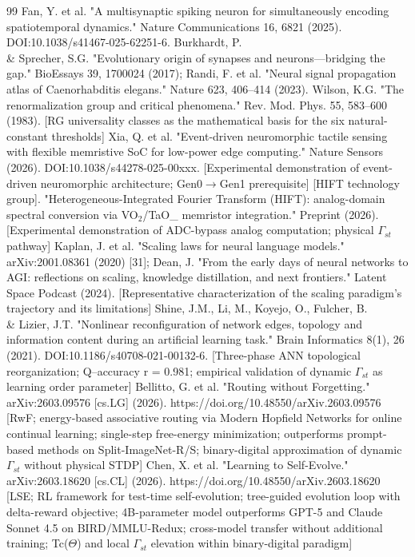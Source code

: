\documentclass[a4paper,12pt]{article}
\begin{document}
\begin{thebibliography}{99}
 Fan, Y. et al. "A multisynaptic spiking neuron for simultaneously encoding spatiotemporal dynamics." Nature Communications 16, 6821 (2025). DOI:10.1038/s41467-025-62251-6.
 Burkhardt, P. \\& Sprecher, S.G. "Evolutionary origin of synapses and neurons---bridging the gap." BioEssays 39, 1700024 (2017); Randi, F. et al. "Neural signal propagation atlas of Caenorhabditis elegans." Nature 623, 406--414 (2023).
 Wilson, K.G. "The renormalization group and critical phenomena." Rev. Mod. Phys. 55, 583--600 (1983). [RG universality classes as the mathematical basis for the six natural-constant thresholds]
 Xia, Q. et al. "Event-driven neuromorphic tactile sensing with flexible memristive SoC for low-power edge computing." Nature Sensors (2026). DOI:10.1038/s44278-025-00xxx. [Experimental demonstration of event-driven neuromorphic architecture; Gen0$\rightarrow$Gen1 prerequisite]
 [HIFT technology group]. "Heterogeneous-Integrated Fourier Transform (HIFT): analog-domain spectral conversion via VO$_2$/TaO_{} memristor integration." Preprint (2026). [Experimental demonstration of ADC-bypass analog computation; physical $\Gamma_{st}$ pathway]
 Kaplan, J. et al. "Scaling laws for neural language models." arXiv:2001.08361 (2020) [31]; Dean, J. "From the early days of neural networks to AGI: reflections on scaling, knowledge distillation, and next frontiers." Latent Space Podcast (2024). [Representative characterization of the scaling paradigm's trajectory and its limitations]
 Shine, J.M., Li, M., Koyejo, O., Fulcher, B. \\& Lizier, J.T. "Nonlinear reconfiguration of network edges, topology and information content during an artificial learning task." Brain Informatics 8(1), 26 (2021). DOI:10.1186/s40708-021-00132-6. [Three-phase ANN topological reorganization; Q--accuracy r = 0.981; empirical validation of dynamic $\Gamma_{st}$ as learning order parameter]
 Bellitto, G. et al. "Routing without Forgetting." arXiv:2603.09576 [cs.LG] (2026). https://doi.org/10.48550/arXiv.2603.09576 [RwF; energy-based associative routing via Modern Hopfield Networks for online continual learning; single-step free-energy minimization; outperforms prompt-based methods on Split-ImageNet-R/S; binary-digital approximation of dynamic $\Gamma_{st}$ without physical STDP]
 Chen, X. et al. "Learning to Self-Evolve." arXiv:2603.18620 [cs.CL] (2026). https://doi.org/10.48550/arXiv.2603.18620 [LSE; RL framework for test-time self-evolution; tree-guided evolution loop with delta-reward objective; 4B-parameter model outperforms GPT-5 and Claude Sonnet 4.5 on BIRD/MMLU-Redux; cross-model transfer without additional training; Tc($\Theta$) and local $\Gamma_{st}$ elevation within binary-digital paradigm]

\end{thebibliography}
\end{document}
